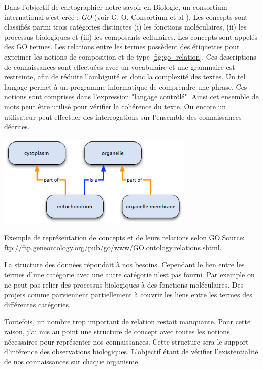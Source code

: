 \begin{refsegment}
Dans l'objectif de cartographier notre savoir en Biologie, un consortium international s'est créé : \textit{\gls{GO}} (voir G. O. Consortium
et al \citeyear{go2001,go2004}). Les concepts sont classifiés parmi trois catégories distinctes (i) les fonctions moléculaires, (ii) les processus biologiques et (iii) les composants cellulaires. Les concepts sont appelés des GO termes. Les relations entre les termes possèdent des étiquettes pour exprimer les notions de composition et de type \cref{fig:go_relation}. Ces descriptions de connaissances sont effectuées avec un vocabulaire et une grammaire est restreinte, afin de réduire l'ambiguïté et donc la complexité des textes. Un tel langage permet à un programme informatique de comprendre une phrase. Ces  notions sont comprises dans l'expression "langage contrôlé". Ainsi cet ensemble de mots peut être utilisé pour vérifier la cohérence du texte. Ou encore un utilisateur peut effectuer des interrogations sur l'ensemble des connaissances décrites.

\begin{shadedfigure}[H]
    \centering
    \includegraphics[width=0.7\textwidth]{img/dag_go_relation.png}
    \caption{Exemple de représentation de concepts et de leurs relations selon \gls{GO}.\hspace{\textwidth}\tiny{Source: \url{ftp://ftp.geneontology.org/pub/go/www/GO.ontology.relations.shtml}.}}
    \label{fig:go_relation}
\end{shadedfigure}


La structure des données répondait à nos besoins. Cependant le lien entre les termes d'une catégorie avec une autre catégorie n'est pas fourni. Par exemple on ne peut pas relier des processus biologiques à des fonctions moléculaires. Des projets comme \cite{AdditionalGO2006} parviennent partiellement à couvrir les liens  entre les termes des différentes catégories.

Toutefois, un nombre trop important de relation restait manquante. Pour cette raison, j'ai mis au point une structure de concept avec toutes les notions nécessaires pour représenter nos connaissances. Cette structure sera le support d'inférence des observations biologiques. L'objectif étant de vérifier l'existentialité de nos connaissances sur chaque organisme.


\end{refsegment}
